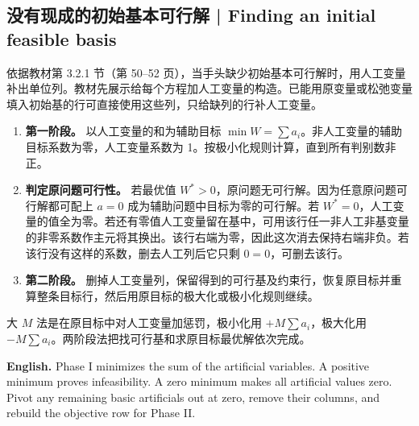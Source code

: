 \documentclass[UTF8,11pt,a4paper]{ctexart}
\newcommand{\EN}[1]{\par\noindent \textbf{English.} #1\par}
\begin{document}
\subsection{没有现成的初始基本可行解 | Finding an initial feasible basis}
\noindent 依据教材第 3.2.1 节（第 50--52 页），当手头缺少初始基本可行解时，用人工变量补出单位列。教材先展示给每个方程加人工变量的构造。已能用原变量或松弛变量填入初始基的行可直接使用这些列，只给缺列的行补人工变量。
\begin{enumerate}[label=\arabic*.]
\item \textbf{第一阶段。} 以人工变量的和为辅助目标 $\min W=\sum a_i$。非人工变量的辅助目标系数为零，人工变量系数为 1。按极小化规则计算，直到所有判别数非正。
\item \textbf{判定原问题可行性。} 若最优值 $W^*>0$，原问题无可行解。因为任意原问题可行解都可配上 $a=0$ 成为辅助问题中目标为零的可行解。若 $W^*=0$，人工变量的值全为零。若还有零值人工变量留在基中，可用该行任一非人工非基变量的非零系数作主元将其换出。该行右端为零，因此这次消去保持右端非负。若该行没有这样的系数，删去人工列后它只剩 $0=0$，可删去该行。
\item \textbf{第二阶段。} 删掉人工变量列，保留得到的可行基及约束行，恢复原目标并重算整条目标行，然后用原目标的极大化或极小化规则继续。
\end{enumerate}
大 $M$ 法是在原目标中对人工变量加惩罚，极小化用 $+M\sum a_i$，极大化用 $-M\sum a_i$。两阶段法把找可行基和求原目标最优解依次完成。
\EN{Phase I minimizes the sum of the artificial variables. A positive minimum proves infeasibility. A zero minimum makes all artificial values zero. Pivot any remaining basic artificials out at zero, remove their columns, and rebuild the objective row for Phase II.}
\end{document}

